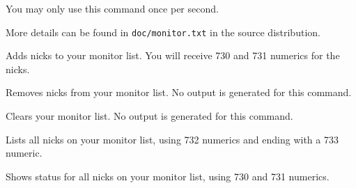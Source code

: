 	You may only use this command once per second.

	More details can be found in \nolinkurl{doc/monitor.txt} in the source
	distribution.


	\literal{,}

	Adds nicks to your monitor list. You will receive 730 and 731 numerics
	for the nicks.


	\literal{,}

	Removes nicks from your monitor list. No output is generated for this
	command.


	Clears your monitor list. No output is generated for this command.


	Lists all nicks on your monitor list, using 732 numerics and ending
	with a 733 numeric.


	Shows status for all nicks on your monitor list, using 730 and 731
	numerics.
